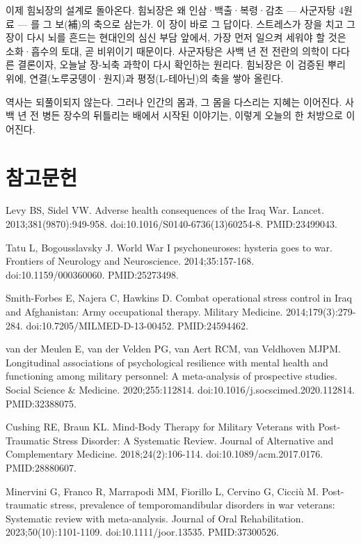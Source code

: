 \documentclass[12pt,oneside]{book}
\newcommand{\refstart}{\par\begingroup\fontsize{8.5pt}{10.2pt}\selectfont\setlength{\parskip}{1.4pt}\raggedright}
\newcommand{\reff}[2]{\par\hangindent=7mm\hangafter=1\noindent[#1]\hspace{2mm}#2\par}
\begin{document}
이제 힘뇌장의 설계로 돌아온다. 힘뇌장은 왜 인삼·백출·복령·감초 — 사군자탕 4원료 — 를 그 보(補)의 축으로 삼는가. 이 장이 바로 그 답이다. 스트레스가 장을 치고 그 장이 다시 뇌를 흔드는 현대인의 심신 부담 앞에서, 가장 먼저 일으켜 세워야 할 것은 소화·흡수의 토대, 곧 비위이기 때문이다. 사군자탕은 사백 년 전 전란의 의학이 다다른 결론이자, 오늘날 장-뇌축 과학이 다시 확인하는 원리다. 힘뇌장은 이 검증된 뿌리 위에, 연결(노루궁뎅이·원지)과 평정(L-테아닌)의 축을 쌓아 올린다.

역사는 되풀이되지 않는다. 그러나 인간의 몸과, 그 몸을 다스리는 지혜는 이어진다. 사백 년 전 병든 장수의 뒤틀리는 배에서 시작된 이야기는, 이렇게 오늘의 한 처방으로 이어진다.

\section*{참고문헌}

\refstart

\reff{1}{Levy BS, Sidel VW. Adverse health consequences of the Iraq War. Lancet. 2013;381(9870):949-958. doi:10.1016/S0140-6736(13)60254-8. PMID:23499043.}

\reff{2}{Tatu L, Bogousslavsky J. World War I psychoneuroses: hysteria goes to war. Frontiers of Neurology and Neuroscience. 2014;35:157-168. doi:10.1159/000360060. PMID:25273498.}

\reff{3}{Smith-Forbes E, Najera C, Hawkins D. Combat operational stress control in Iraq and Afghanistan: Army occupational therapy. Military Medicine. 2014;179(3):279-284. doi:10.7205/MILMED-D-13-00452. PMID:24594462.}

\reff{4}{van der Meulen E, van der Velden PG, van Aert RCM, van Veldhoven MJPM. Longitudinal associations of psychological resilience with mental health and functioning among military personnel: A meta-analysis of prospective studies. Social Science \& Medicine. 2020;255:112814. doi:10.1016/j.socscimed.2020.112814. PMID:32388075.}

\reff{5}{Cushing RE, Braun KL. Mind-Body Therapy for Military Veterans with Post-Traumatic Stress Disorder: A Systematic Review. Journal of Alternative and Complementary Medicine. 2018;24(2):106-114. doi:10.1089/acm.2017.0176. PMID:28880607.}

\reff{6}{Minervini G, Franco R, Marrapodi MM, Fiorillo L, Cervino G, Cicciù M. Post-traumatic stress, prevalence of temporomandibular disorders in war veterans: Systematic review with meta-analysis. Journal of Oral Rehabilitation. 2023;50(10):1101-1109. doi:10.1111/joor.13535. PMID:37300526.}
\end{document}
